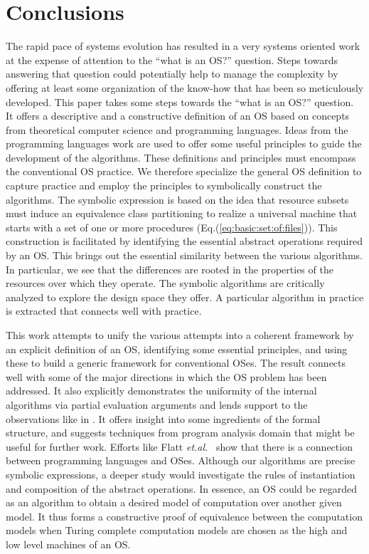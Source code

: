 \documentclass[draft]{article}
\def\etal{{\it et.al.}\ }
\begin{document}
\section{Conclusions}
\label{sec:conclusions}

The rapid  pace of  systems evolution has  resulted in a  very systems
oriented work  at the expense of  attention to the ``what  is an OS?''
question.   Steps towards  answering that  question  could potentially
help to manage  the complexity by offering at  least some organization
of the know-how  that has been so meticulously  developed.  This paper
takes some steps towards the ``what is an OS?'' question.  It offers a
descriptive and a  constructive definition of an OS  based on concepts
from  theoretical computer science  and programming  languages.  Ideas
from  the programming  languages work  are used  to offer  some useful
principles  to  guide  the   development  of  the  algorithms.   These
definitions  and   principles  must  encompass   the  conventional  OS
practice.   We  therefore  specialize  the general  OS  definition  to
capture practice  and employ the principles  to symbolically construct
the algorithms.   The symbolic  expression is based  on the  idea that
resource  subsets must  induce  an equivalence  class partitioning  to
realize a  universal machine  that starts  with a set  of one  or more
procedures  (Eq.(\ref{eq:basic:set:of:files})).  This  construction is
facilitated by identifying  the essential abstract operations required
by  an OS.   This  brings  out the  essential  similarity between  the
various algorithms.   In particular, we  see that the  differences are
rooted in  the properties  of the resources  over which  they operate.
The symbolic algorithms are  critically analyzed to explore the design
space  they offer.  A  particular algorithm  in practice  is extracted
that connects well with practice.

This  work attempts  to unify  the  various attempts  into a  coherent
framework  by  an  explicit  definition  of an  OS,  identifying  some
essential principles, and using these to build a generic framework for
conventional OSes.   The result connects  well with some of  the major
directions  in which  the  OS  problem has  been  addressed.  It  also
explicitly demonstrates the uniformity  of the internal algorithms via
partial  evaluation arguments  and lends  support to  the observations
like in  \cite{Esser11}.  It offers  insight into some  ingredients of
the formal  structure, and  suggests techniques from  program analysis
domain  that might  be useful  for further  work.  Efforts  like Flatt
\etal  \cite{Flatt:1999:PLO:317765.317793}   show  that  there   is  a
connection  between  programming  languages  and OSes.   Although  our
algorithms  are precise  symbolic  expressions, a  deeper study  would
investigate the rules of instantiation and composition of the abstract
operations.  In  essence, an OS could  be regarded as  an algorithm to
obtain a  desired model of  computation over another given  model.  It
thus forms a constructive proof of equivalence between the computation
models when Turing complete computation  models are chosen as the high
and low level machines of an OS.
\end{document}
